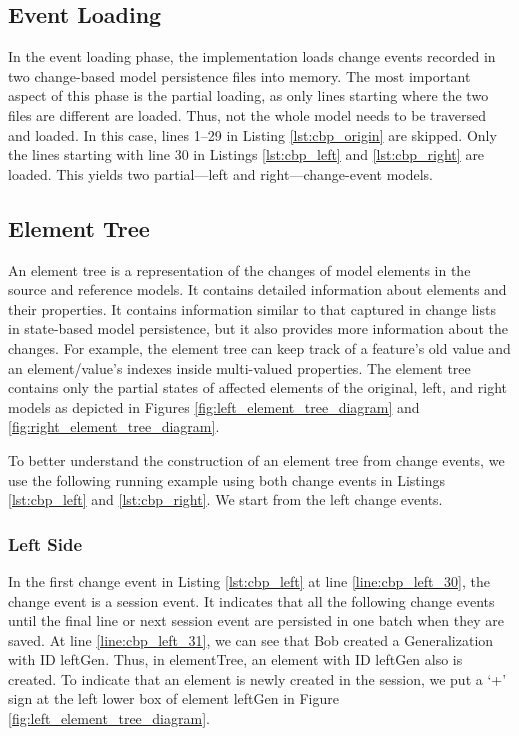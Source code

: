 \subsection{Event Loading}
\label{sec:event_loading}
In the event loading phase, the implementation loads change events recorded in two change-based model persistence files into memory.
The most important aspect of this phase is the partial loading, as only lines starting where the two files are different are loaded.
Thus, not the whole model needs to be traversed and loaded.
In this case, lines 1–29 in Listing \ref{lst:cbp_origin} are skipped. Only the lines starting with line 30 in Listings \ref{lst:cbp_left} and \ref{lst:cbp_right} are loaded. This yields two partial—left and right—change-event models.

\subsection{Element Tree}
\label{sec:tree_construction}
An element tree is a representation of the changes of model elements in the source and reference models. It contains detailed information about elements and their properties. It contains information similar to that captured in change lists in state-based model persistence, but it also provides more information about the changes. For example, the element tree can keep track of a feature’s old value and an element/value’s indexes inside multi-valued properties. The element tree contains only the partial states of affected elements of the original, left, and right models as depicted in Figures \ref{fig:left_element_tree_diagram} and \ref{fig:right_element_tree_diagram}.

To better understand the construction of an element tree from change events, we use the following running example using both change events in Listings \ref{lst:cbp_left} and \ref{lst:cbp_right}. We start from the left change events.

\subsubsection{Left Side}\label{sec:left_side}
In the first change event in Listing \ref{lst:cbp_left} at line \ref{line:cbp_left_30}, the change event is a \textsf{session} event. It indicates that all the following change events until the final line or next \textsf{session} event are persisted in one batch when they are saved. At line \ref{line:cbp_left_31}, we can see that Bob created a \textsf{Generalization} with ID \textsf{leftGen}. Thus, in \textsf{elementTree}, an element with ID \textsf{leftGen} also is created. To indicate that an element is newly created in the session, we put a ‘+’ sign at the left lower box of element \textsf{leftGen} in Figure \ref{fig:left_element_tree_diagram}.

